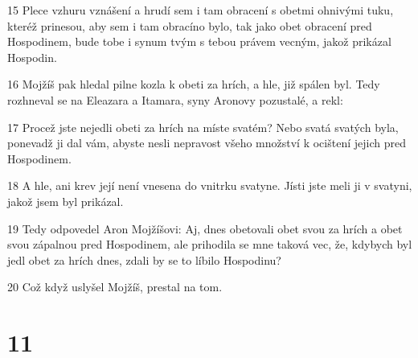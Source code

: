 \par 15 Plece vzhuru vznášení a hrudí sem i tam obracení s obetmi ohnivými tuku, kteréž prinesou, aby sem i tam obracíno bylo, tak jako obet obracení pred Hospodinem, bude tobe i synum tvým s tebou právem vecným, jakož prikázal Hospodin.
\par 16 Mojžíš pak hledal pilne kozla k obeti za hrích, a hle, již spálen byl. Tedy rozhneval se na Eleazara a Itamara, syny Aronovy pozustalé, a rekl:
\par 17 Procež jste nejedli obeti za hrích na míste svatém? Nebo svatá svatých byla, ponevadž ji dal vám, abyste nesli nepravost všeho množství k ocištení jejich pred Hospodinem.
\par 18 A hle, ani krev její není vnesena do vnitrku svatyne. Jísti jste meli ji v svatyni, jakož jsem byl prikázal.
\par 19 Tedy odpovedel Aron Mojžíšovi: Aj, dnes obetovali obet svou za hrích a obet svou zápalnou pred Hospodinem, ale prihodila se mne taková vec, že, kdybych byl jedl obet za hrích dnes, zdali by se to líbilo Hospodinu?
\par 20 Což když uslyšel Mojžíš, prestal na tom.

\chapter{11}

